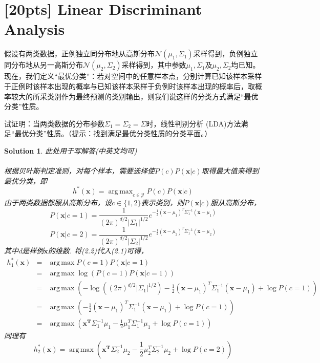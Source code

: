 \documentclass[a4paper,UTF8]{article}
\DeclareMathOperator*{\argmax}{arg\,max}
\numberwithin{equation}{section}
\newtheorem*{solution}{Solution}
\begin{document}
\section{[20pts] Linear Discriminant Analysis}
假设有两类数据，正例独立同分布地从高斯分布$\mathcal{N}(\mu_1,\Sigma_1)$采样得到，负例独立同分布地从另一高斯分布$\mathcal{N}(\mu_2,\Sigma_2)$采样得到，其中参数$\mu_1,\Sigma_1$及$\mu_2,\Sigma_2$均已知。现在，我们定义“最优分类”：若对空间中的任意样本点，分别计算已知该样本采样于正例时该样本出现的概率与已知该样本采样于负例时该样本出现的概率后，取概率较大的所采类别作为最终预测的类别输出，则我们说这样的分类方式满足“最优分类”性质。

试证明：当两类数据的分布参数$\Sigma_1=\Sigma_2=\Sigma$时，线性判别分析 (LDA)方法满足“最优分类”性质。（提示：找到满足最优分类性质的分类平面。）
\begin{solution}
	此处用于写解答(中英文均可)
\\ \\
根据贝叶斯判定准则，对每个样本，需要选择使$P(c)P(\bm{x}|c)$取得最大值来得到最优分类，即
\begin{equation}
    h^*(\bm{x}) = \argmax_{c \in \mathcal{Y}} P(c)P(\bm{x}|c)
\end{equation}
由于两类数据都服从高斯分布，设$c \in \{1,2\}$表示类别，则$P(\bm{x}|c)$服从高斯分布，
\begin{equation}
    P(\bm{x}|c=1) = \frac{1}{(2\pi)^{d/2}|\Sigma_1|^{1/2}}e^{-\frac{1}{2}(\bm{x}-\mu_1)^T\Sigma_1^{-1}(\bm{x}-\mu_1)}
\end{equation}
\begin{equation}
P(\bm{x}|c=2) = \frac{1}{(2\pi)^{d/2}|\Sigma_2|^{1/2}}e^{-\frac{1}{2}(\bm{x}-\mu_2)^T\Sigma_1^{-1}(\bm{x}-\mu_2)}
\end{equation}
其中d是样例$\bm{x}$的维数.
将(2.2)代入(2.1)可得，
\begin{eqnarray*}
    h_1^*(\bm{x}) &=& \argmax P(c=1)P(\bm{x}|c=1)\\
    &=& \argmax \log(P(c=1)P(\bm{x}|c=1))   \\
    &=& \argmax \left(-\log ((2\pi)^{d/2}|\Sigma_1|^{1/2})-\frac{1}{2}(\bm{x}-\mu_1)^T\Sigma_1^{-1}(\bm{x}-\mu_1) + \log P(c=1)\right)\\
    &=& \argmax \left(-\frac{1}{2}(\bm{x}-\mu_1)^T\Sigma_1^{-1}(\bm{x}-\mu_1) + \log P(c=1)\right)\\
    &=& \argmax \left(\bm{x^T}\Sigma_1^{-1}\mu_1 - \frac{1}{2}\mu_1^T\Sigma_1^{-1}\mu_1+\log P(c=1)\right)
\end{eqnarray*}
同理有
\[
    h_2^*(\bm{x}) = \argmax \left(\bm{x^T}\Sigma_2^{-1}\mu_2 - \frac{1}{2}\mu_2^T\Sigma_2^{-1}\mu_2+\log P(c=2)\right)
\]
\end{solution}
\end{document}
